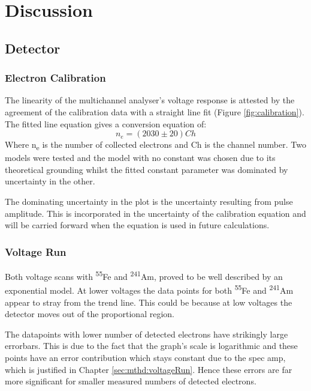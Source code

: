 \chapter{Discussion}

\section{Detector}

\subsection{Electron Calibration}
The linearity of the multichannel analyser's voltage response is attested by the agreement of the calibration data with a straight line fit (Figure \ref{fig:calibration}). The fitted line equation gives a conversion equation of:
\begin{equation}
    n_{e} = (2030\pm20)Ch
\end{equation}
Where n\textsubscript{e} is the number of collected electrons and Ch is the channel number. Two models were tested and the model with no constant was chosen due to its theoretical grounding whilst the fitted constant parameter was dominated by uncertainty in the other.

The dominating uncertainty in the plot is the uncertainty resulting from pulse amplitude. This is incorporated in the uncertainty of the calibration equation and will be carried forward when the equation is used in future calculations.

\subsection{Voltage Run}

Both voltage scans with \textsuperscript{55}Fe and \textsuperscript{241}Am, proved to be well described by an exponential model. At lower voltages the data points for both \textsuperscript{55}Fe and \textsuperscript{241}Am appear to stray from the trend line. This could be because at low voltages the detector moves out of the proportional region.

The datapoints with lower number of detected electrons have strikingly large errorbars. This is due to the fact that the graph's scale is logarithmic and these points have an error contribution which stays constant due to the spec amp, which is justified in Chapter \ref{sec:mthd:voltageRun}. Hence these errors are far more significant for smaller measured numbers of detected electrons.

